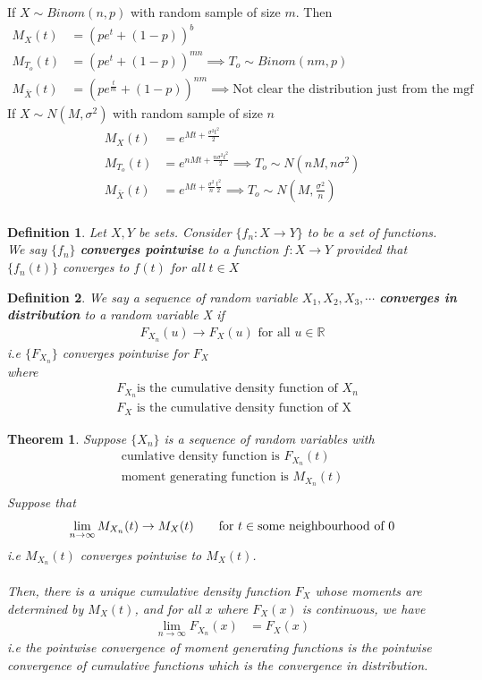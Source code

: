 \documentclass[11pt,oneside]{book}
\theoremstyle{break}
\theoremstyle{break}
\newtheorem{thm}{Theorem}[section]
\newtheorem{defn}{Definition}[corL]
\newcommand{\R}{\mathbb{R}}
\begin{document}
If $X\sim Binom(n,p)$ with random sample of size $m$. Then \begin{align*}
M_X(t)&=\left( pe^t+(1-p)\right)^b\\
M_{T_o}(t)&=\left( pe^t+(1-p)\right)^{mn} \implies T_o\sim Binom(nm,p)\\
M_{\bar{X}}(t)&=\left(pe^{\frac{t}{m}}+(1-p) \right)^{nm}\implies \text{Not clear the distribution just from the mgf}
\end{align*}
If $X\sim N(M,\sigma^2)$ with random sample of size $n$\begin{align*}
M_{X}(t)&=e^{Mt+\frac{\sigma^2t^2}{2}}\\
M_{T_o}(t)&=e^{nMt+\frac{n\sigma^2t^2}{2}}\implies T_o\sim N(nM,n\sigma^2)\\
M_{\bar{X}}(t)&=e^{Mt+\frac{\sigma^2}{n}\frac{t^2}{2}}\implies T_o\sim N(M,\frac{\sigma^2}{n})\\
\end{align*}
\begin{defn}
Let $X,Y$ be sets. Consider $\{f_n:X\to Y\}$ to be a set of functions. \\
We say $\{f_n\}$ \textbf{converges pointwise} to a function  $f:X\to Y$ provided that $\{f_n(t)\}$ converges to $f(t)$ for all $t\in X$
\end{defn}
\begin{defn} 
We say a sequence of random variable $X_1,X_2,X_3,\cdots$ \textbf{converges in distribution} to a random variable X if \begin{align*}
F_{X_n}(u) \longrightarrow F_{X}(u) \text{ for all }u\in \R
\end{align*}
i.e $\{F_{X_n}\}$ converges pointwise for $F_X$\\
where \begin{align*}
&F_{X_n}  \text{is the cumulative density function of }X_n\\
&F_{X}\text{ is the cumulative density function of X}
\end{align*}
\end{defn}
\begin{thm}
Suppose $\{X_n\}$ is a sequence of random variables with \begin{align*}
\text{cumlative density function is }  F_{X_n}(t)\\
\text{moment generating function is } M_{X_n}(t)\\
\end{align*}
Suppose that \begin{align*}
\lim_{n\rightarrow \infty} M_{X_n}(t) \rightarrow M_X(t) \text{\qquad for }t\in \text{some neighbourhood of }0  
\end{align*}
i.e $M_{X_n}(t)$ converges pointwise to $M_X(t)$.\\
\hfill\\
Then, there is a unique cumulative density function $F_X$ whose moments are determined by $M_X(t)$, and for all $x$ where $F_X(x)$ is continuous, we have \begin{align*}
\lim_{n\rightarrow \infty}F_{X_{n}}(x)&= F_X(x)
\end{align*}
i.e the pointwise convergence of moment generating functions is the pointwise convergence of cumulative functions which is the convergence in distribution.
\end{thm}
\end{document}

